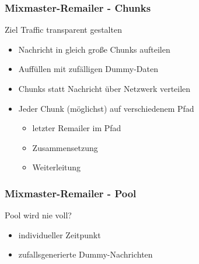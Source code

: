 \documentclass{beamer}
\begin{document}
\begin{frame}
	\frametitle{Mixmaster-Remailer - Chunks}
	\begin{exampleblock}{Ziel}
		Traffic transparent gestalten
	\end{exampleblock}

	\begin{itemize}	
		\item Nachricht in gleich große Chunks aufteilen
		\item Auffüllen mit zufälligen Dummy-Daten
		\item Chunks statt Nachricht über Netzwerk verteilen
		\item Jeder Chunk (möglichst) auf verschiedenem Pfad
		\begin{itemize}
			\item letzter Remailer im Pfad
			\item Zusammensetzung
			\item Weiterleitung
		\end{itemize}	
	\end{itemize}	
\end{frame}

\begin{frame}
	\frametitle{Mixmaster-Remailer - Pool}

	 {
	\begin{alertblock}{Pool wird nie voll?}
		\begin{itemize}
			\item individueller Zeitpunkt
			\item zufallsgenerierte Dummy-Nachrichten
		\end{itemize}
	\end{alertblock}
	}
\end{frame}
\end{document}
